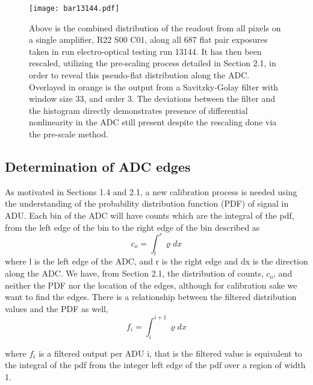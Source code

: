 \documentclass[11pt, letterpaper]{article}
\begin{document}
\begin{figure}
	\texttt{[image: bar13144.pdf]}
	\caption{Above is the combined distribution of the readout from all pixels on a single amplifier, R22 S00 C01, along all 687 flat pair exposures taken in run electro-optical testing 	run 13144. It has then been rescaled, utilizing the pre-scaling process detailed in Section 2.1, in order to reveal this pseudo-flat distribution along the ADC. Overlayed in orange is the output from a Savitzky-Golay filter with window size 33, and order 3. The deviations between the filter and the histogram directly demonstrates presence of differential nonlinearity in the ADC still present despite the rescaling done via the pre-scale method.}
\end{figure}

\subsection{Determination of ADC edges} 	
\indent

As motivated in Sections 1.4 and 2.1, a new calibration process is needed using the understanding of the probability distribution function (PDF) of signal in ADU. 
Each bin of the ADC will have counts which are the integral of the pdf, from the left edge of the bin to the right edge of the bin described as
 \begin{equation}\label{}
c_o =  \int_{l}^{r} \varrho dx
\end{equation}
where l is the left edge of the ADC, and r is the right edge and dx is the direction along the ADC. 
We have, from Section 2.1, the distribution of counts, $c_{o}$, and neither the PDF nor the location of the edges, although for calibration sake we want to find the edges. 
There is a relationship between the filtered distribution values and the PDF as well,
 \begin{equation}\label{}
f_i =  \int_{i}^{i+1} \varrho dx
\end{equation}

where $f_{i}$ is a filtered output per ADU i, that is the filtered value is equivalent to the integral of the pdf from the integer left edge of the pdf over a region of width 1. 
\indent 
\end{document}
